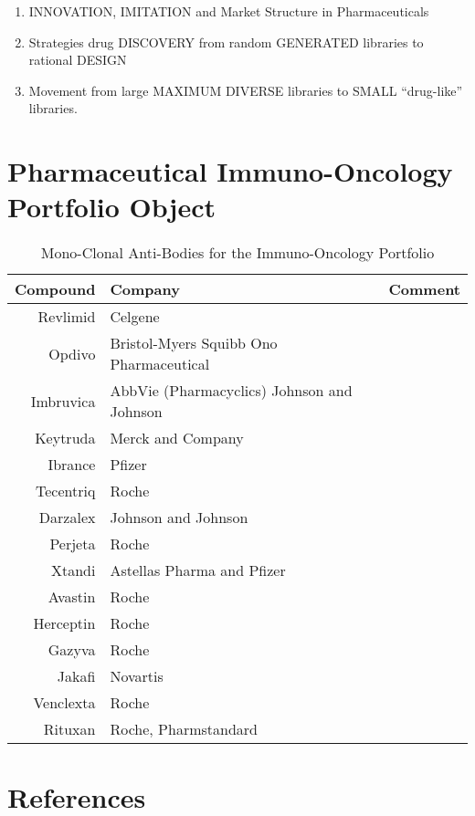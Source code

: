 


\begin{enumerate}
	\item INNOVATION, IMITATION and Market Structure in Pharmaceuticals \cite{key400}
	\item Strategies drug DISCOVERY from random GENERATED libraries to rational DESIGN \cite{key500}
	\item Movement from large MAXIMUM DIVERSE libraries to SMALL “drug-like” libraries. \cite{key500}
\end{enumerate}

\section{Pharmaceutical Immuno-Oncology Portfolio Object}

\begin{table}
	\caption{Mono-Clonal Anti-Bodies for the Immuno-Oncology Portfolio \cite{key8001} }
	\begin{tabular}{r|p{4cm}|l}
		Compound & Company & Comment \\
		\hline
		Revlimid & Celgene & \\
		Opdivo & Bristol-Myers Squibb Ono Pharmaceutical & \\
		Imbruvica & AbbVie (Pharmacyclics) Johnson and Johnson & \\
		Keytruda & Merck and Company & \\
		Ibrance & Pfizer & \\
		Tecentriq & Roche & \\
		Darzalex & Johnson and Johnson & \\
		Perjeta & Roche & \\
		Xtandi & Astellas Pharma and Pfizer & \\
		Avastin & Roche & \\
		Herceptin & Roche & \\
		Gazyva & Roche & \\
		Jakafi & Novartis & \\
		Venclexta & Roche & \\
		Rituxan & Roche, Pharmstandard & \\
		\hline
	\end{tabular}
\end{table}


\section{References}


